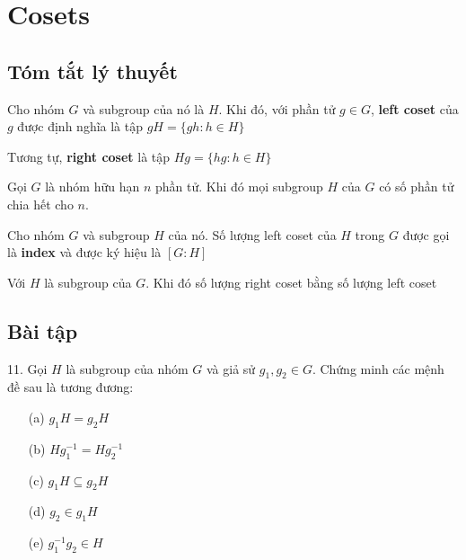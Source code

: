 \section*{Cosets}

\subsection*{Tóm tắt lý thuyết}

\begin{definition}
    Cho nhóm $G$ và subgroup của nó là $H$. Khi đó, với phần tử $g \in G$, \textbf{left coset} của $g$ được định nghĩa là tập $gH = \{gh : h \in H\}$
\end{definition}

\begin{definition}
    Tương tự, \textbf{right coset} là tập $Hg = \{hg : h \in H\}$
\end{definition}

\begin{theorem}
    Gọi $G$ là nhóm hữu hạn $n$ phần tử. Khi đó mọi subgroup $H$ của $G$ có số phần tử chia hết cho $n$.
\end{theorem}

\begin{definition}
    Cho nhóm $G$ và subgroup $H$ của nó. Số lượng left coset của $H$  trong $G$ được gọi là \textbf{index} và được ký hiệu là $[G:H]$
\end{definition}

\begin{theorem}
    Với $H$ là subgroup của $G$. Khi đó số lượng right coset bằng số lượng left coset
\end{theorem}

\subsection*{Bài tập}

11. Gọi $H$ là subgroup của nhóm $G$ và giả sử $g_1, g_2 \in G$. Chứng minh các mệnh đề sau là tương đương:

\begin{itemize}
    \item[(a)] $g_1 H = g_2 H$
    \item[(b)] $H g_1^{-1} = H g_2^{-1}$
    \item[(c)] $g_1 H \subseteq g_2 H$
    \item[(d)] $g_2 \in g_1 H$
    \item[(e)] $g_1^{-1} g_2 \in H$ 
\end{itemize}

